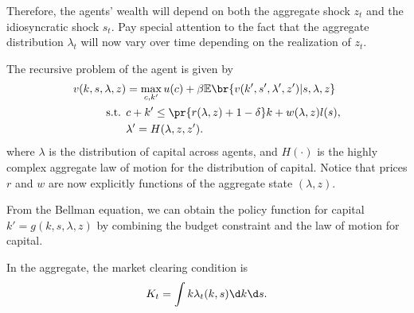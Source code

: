 Therefore, the agents' wealth will depend on both the aggregate shock $z_t$ and the idiosyncratic shock $s_t$. Pay special attention to the fact that the aggregate distribution $\lambda_t$ will now vary over time depending on the realization of $z_t$.

The recursive problem of the agent is given by
\[
\begin{aligned}
    v(k,s,\lambda, z) & = \max_{c,k'} u(c) + \beta \mathbb E\br{v(k',s',\lambda', z')|s,\lambda,z}\\
\text{s.t. } & c + k' \le \pr{r(\lambda,z)+1-\delta}k + w(\lambda,z)l(s),\\
& \lambda' = H(\lambda, z,z').
\end{aligned}
\]
where $\lambda$ is the distribution of capital across agents, and $H(\cdot)$ is the highly complex aggregate law of motion for the distribution of capital. Notice that prices $r$ and $w$ are now explicitly functions of the aggregate state $(\lambda, z)$.

From the Bellman equation, we can obtain the policy function for capital $k' = g(k,s,\lambda,z)$ by combining the budget constraint and the law of motion for capital.

In the aggregate, the market clearing condition is
\[
K_t = \int k\lambda_t(k,s)\d k\d s.
\]


